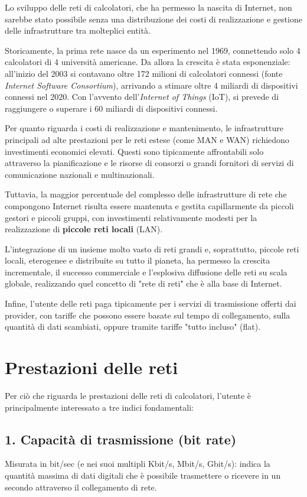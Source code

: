 \documentclass[a4paper,12pt]{report}
\begin{document}
Lo sviluppo delle reti di calcolatori, che ha permesso la nascita di Internet, non sarebbe stato possibile senza una distribuzione dei costi di realizzazione e gestione delle infrastrutture tra molteplici entità. 

Storicamente, la prima rete nasce da un esperimento nel 1969, connettendo solo 4 calcolatori di 4 università americane. Da allora la crescita è stata esponenziale: all'inizio del 2003 si contavano oltre 172 milioni di calcolatori connessi (fonte \textit{Internet Software Consortium}), arrivando a stimare oltre 4 miliardi di dispositivi connessi nel 2020. Con l'avvento dell'\textit{Internet of Things} (IoT), si prevede di raggiungere o superare i 60 miliardi di dispositivi connessi.

Per quanto riguarda i costi di realizzazione e mantenimento, le infrastrutture principali ad alte prestazioni per le reti estese (come MAN e WAN) richiedono investimenti economici elevati. Questi sono tipicamente affrontabili solo attraverso la pianificazione e le risorse di consorzi o grandi fornitori di servizi di comunicazione nazionali e multinazionali.

Tuttavia, la maggior percentuale del complesso delle infrastrutture di rete che compongono Internet risulta essere mantenuta e gestita capillarmente da piccoli gestori e piccoli gruppi, con investimenti relativamente modesti per la realizzazione di \textbf{piccole reti locali} (LAN). 

L’integrazione di un insieme molto vasto di reti grandi e, soprattutto, piccole reti locali, eterogenee e distribuite su tutto il pianeta, ha permesso la crescita incrementale, il successo commerciale e l'esplosiva diffusione delle reti su scala globale, realizzando quel concetto di "rete di reti" che è alla base di Internet.

Infine, l'utente delle reti paga tipicamente per i servizi di trasmissione offerti dai provider, con tariffe che possono essere basate sul tempo di collegamento, sulla quantità di dati scambiati, oppure tramite tariffe "tutto incluso" (flat).

\newpage
\newpage
\section{Prestazioni delle reti}
Per ciò che riguarda le prestazioni delle reti di calcolatori, l'utente è principalmente interessato a tre indici fondamentali:

\subsection*{1. Capacità di trasmissione (bit rate)}
\begin{defbox}{}
Misurata in bit/sec (e nei suoi multipli Kbit/s, Mbit/s, Gbit/s): indica la quantità massima di dati digitali che è possibile trasmettere o ricevere in un secondo attraverso il collegamento di rete.
\end{defbox}
\end{document}
